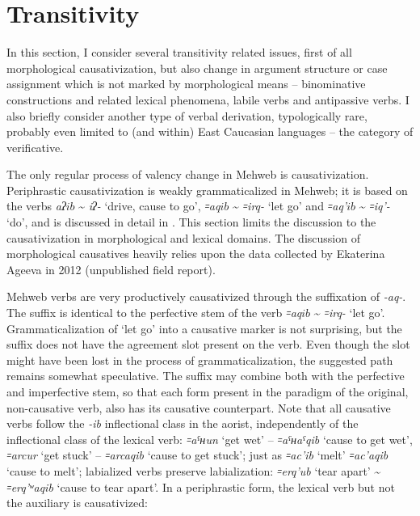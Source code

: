 \documentclass[output=paper]{langsci/langscibook}
\begin{document}

\section{Transitivity}\label{transitivity}


In this section, I consider several transitivity related issues, first
of all morphological causativization, but also change in argument structure or case assignment
which is not marked by morphological means –
binominative constructions and related lexical phenomena, labile verbs
and antipassive verbs. I also briefly consider another type of verbal
derivation, typologically rare, probably even limited to (and within)
East Caucasian languages – the category of verificative.

The only regular process of valency change in Mehweb is causativization.
Periphrastic causativization is weakly grammaticalized in Mehweb; it is
based on the verbs \emph{aʔ\(ib\)} \textasciitilde{} \emph{iʔ-} `drive, cause to
go', \emph{꞊aq\(ib\)} \textasciitilde{} \emph{꞊irq-} `let go' and \emph{꞊aq'\(ib\)}
\textasciitilde{} \emph{꞊iq'-} `do', and is discussed in detail in
\citet{barylnikova2019}. This section limits the discussion to the
causativization in morphological and lexical domains. The discussion of
morphological causatives heavily relies upon the data collected by
Ekaterina Ageeva in 2012 (unpublished field report).

Mehweb verbs are very productively causativized through the suffixation
of \emph{-aq-}. The suffix is identical to the perfective stem of the
verb \emph{꞊aq\(ib\)} \textasciitilde{} \emph{꞊irq-} `let go'. Grammaticalization
of `let go' into a causative marker is not surprising, but the suffix
does not have the agreement slot present on the verb. Even though the
slot might have been lost in the process of grammaticalization, the
suggested path remains somewhat speculative. The suffix may combine both
with the perfective and imperfective stem, so that each form present in
the paradigm of the original, non-causative verb, also has its
causative counterpart. Note that all causative verbs follow the
\emph{-ib} inflectional class in the aorist, independently of the
inflectional class of the lexical verb: \emph{꞊aˤʜun} `get wet' –
\emph{꞊aˤʜaˤqib} `cause to get wet', \emph{꞊arcur} `get stuck' –
\emph{꞊arcaqib} `cause to get stuck'; just as \emph{꞊ac'ib} `melt'
\emph{꞊ac'aqib} `cause to melt'; labialized verbs preserve
labialization: \emph{꞊erq'ub} `tear apart' \textasciitilde{}
\emph{꞊erq'ʷaqib} `cause to tear apart'. In a periphrastic form, the
lexical verb but not the auxiliary is causativized:
\end{document}
